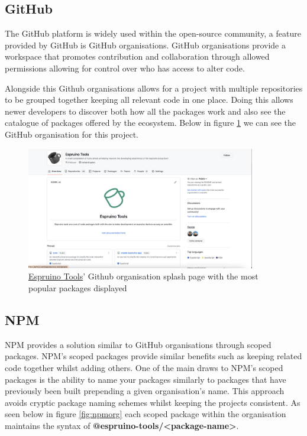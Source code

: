 \documentclass{l4proj}
\begin{document}
\subsection{GitHub}
The GitHub platform is widely used within the open-source community, a feature provided by GitHub is GitHub organisations. GitHub organisations provide a workspace that promotes contribution and collaboration through allowed permissions allowing for control over who has access to alter code. 

\text Alongside this Github organisations allows for a project with multiple repositories to be grouped together keeping all relevant code in one place. Doing this allows newer developers to discover both how all the packages work and also see the catalogue of packages offered by the ecosystem. Below in figure \ref{fig:ghorg} we can see the GitHub organisation for this project.

\begin{figure}[!ht]
    \centering
    \includegraphics[width=10cm]{dissertation/images/github-organisation.png}
    \caption{\href{https://github.com/espruino-tools}{Espruino Tools}' Github organisation splash page with the most popular packages displayed}
    \label{fig:ghorg}
\end{figure}

\subsection{NPM}

NPM provides a solution similar to GitHub organisations through scoped packages. NPM's scoped packages provide similar benefits such as keeping related code together whilst adding others. One of the main draws to NPM's scoped packages is the ability to name your packages similarly to packages that have previously been built prepending a given organisation's name. This approach avoids cryptic package naming schemes whilst keeping the projects consistent. As seen below in figure \ref{fig:npmorg} each scoped package within the organisation maintains the syntax of \textbf{@espruino-tools/<package-name>}.
\end{document}
